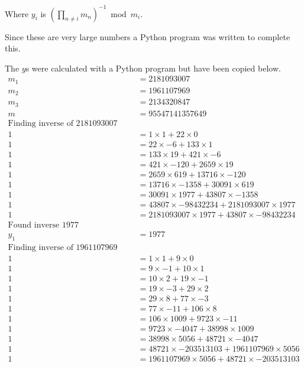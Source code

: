 \documentclass{article}
\begin{document}
Where $y_i$ is $(\prod_{n \neq i} m_n)^{-1} \bmod m_i$.

Since these are very large numbers a Python program was written to complete
this.


The $y$s were calculated with a Python program but have been copied below.
\begin{align*}
    m_1 &= 2181093007 \\
    m_2 &= 1961107969 \\
    m_3 &= 2134320847 \\
    m &= 95547141357649 \\
    \text{Finding inverse of 2181093007 and 43807} \\
    1 &= 1 \times 1 + 22 \times 0 \\
    1 &= 22 \times -6 + 133 \times 1 \\
    1 &= 133 \times 19 + 421 \times -6 \\
    1 &= 421 \times -120 + 2659 \times 19 \\
    1 &= 2659 \times 619 + 13716 \times -120 \\
    1 &= 13716 \times -1358 + 30091 \times 619 \\
    1 &= 30091 \times 1977 + 43807 \times -1358 \\
    1 &= 43807 \times -98432234 + 2181093007 \times 1977 \\
    1 &= 2181093007 \times 1977 + 43807 \times -98432234 \\
    \text{Found inverse 1977} \\
    y_1 &= 1977 \\
    \text{Finding inverse of 1961107969 and 48721} \\
    1 &= 1 \times 1 + 9 \times 0 \\
    1 &= 9 \times -1 + 10 \times 1 \\
    1 &= 10 \times 2 + 19 \times -1 \\
    1 &= 19 \times -3 + 29 \times 2 \\
    1 &= 29 \times 8 + 77 \times -3 \\
    1 &= 77 \times -11 + 106 \times 8 \\
    1 &= 106 \times 1009 + 9723 \times -11 \\
    1 &= 9723 \times -4047 + 38998 \times 1009 \\
    1 &= 38998 \times 5056 + 48721 \times -4047 \\
    1 &= 48721 \times -203513103 + 1961107969 \times 5056 \\
    1 &= 1961107969 \times 5056 + 48721 \times -203513103 \\

\end{align*}
\end{document}
